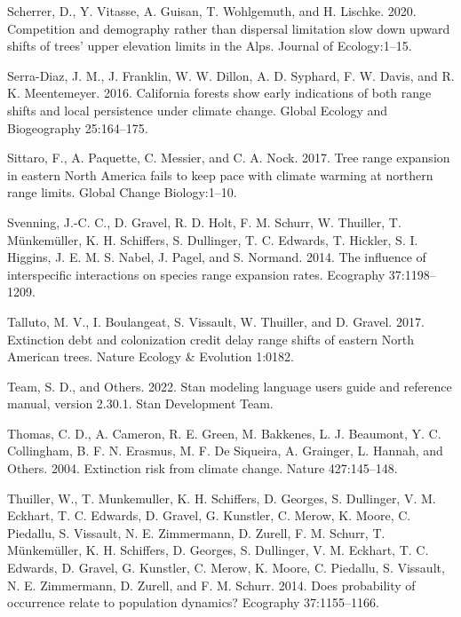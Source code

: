 \documentclass[12pt]{article}
\newlength{\cslhangindent}
\newenvironment{cslreferences}%
  {\setlength{\parindent}{0pt}%
  \everypar{\setlength{\hangindent}{\cslhangindent}}\ignorespaces}%
  {\par}
\begin{document}
\begin{cslreferences}
\leavevmode\hypertarget{ref-Scherrer2020}{}%
Scherrer, D., Y. Vitasse, A. Guisan, T. Wohlgemuth, and H. Lischke.
2020. Competition and demography rather than dispersal limitation slow
down upward shifts of trees' upper elevation limits in the Alps. Journal
of Ecology:1--15.

\leavevmode\hypertarget{ref-SerraDiaz2016}{}%
Serra-Diaz, J. M., J. Franklin, W. W. Dillon, A. D. Syphard, F. W.
Davis, and R. K. Meentemeyer. 2016. California forests show early
indications of both range shifts and local persistence under climate
change. Global Ecology and Biogeography 25:164--175.

\leavevmode\hypertarget{ref-Sittaro2017}{}%
Sittaro, F., A. Paquette, C. Messier, and C. A. Nock. 2017. Tree range
expansion in eastern North America fails to keep pace with climate
warming at northern range limits. Global Change Biology:1--10.

\leavevmode\hypertarget{ref-Svenning2014}{}%
Svenning, J.-C. C., D. Gravel, R. D. Holt, F. M. Schurr, W. Thuiller, T.
Münkemüller, K. H. Schiffers, S. Dullinger, T. C. Edwards, T. Hickler,
S. I. Higgins, J. E. M. S. Nabel, J. Pagel, and S. Normand. 2014. The
influence of interspecific interactions on species range expansion
rates. Ecography 37:1198--1209.

\leavevmode\hypertarget{ref-Talluto2017}{}%
Talluto, M. V., I. Boulangeat, S. Vissault, W. Thuiller, and D. Gravel.
2017. Extinction debt and colonization credit delay range shifts of
eastern North American trees. Nature Ecology \& Evolution 1:0182.

\leavevmode\hypertarget{ref-stan2022stan}{}%
Team, S. D., and Others. 2022. Stan modeling language users guide and
reference manual, version 2.30.1. Stan Development Team.

\leavevmode\hypertarget{ref-thomas2004}{}%
Thomas, C. D., A. Cameron, R. E. Green, M. Bakkenes, L. J. Beaumont, Y.
C. Collingham, B. F. N. Erasmus, M. F. De Siqueira, A. Grainger, L.
Hannah, and Others. 2004. Extinction risk from climate change. Nature
427:145--148.

\leavevmode\hypertarget{ref-Thuiller2014}{}%
Thuiller, W., T. Munkemuller, K. H. Schiffers, D. Georges, S. Dullinger,
V. M. Eckhart, T. C. Edwards, D. Gravel, G. Kunstler, C. Merow, K.
Moore, C. Piedallu, S. Vissault, N. E. Zimmermann, D. Zurell, F. M.
Schurr, T. Münkemüller, K. H. Schiffers, D. Georges, S. Dullinger, V. M.
Eckhart, T. C. Edwards, D. Gravel, G. Kunstler, C. Merow, K. Moore, C.
Piedallu, S. Vissault, N. E. Zimmermann, D. Zurell, and F. M. Schurr.
2014. Does probability of occurrence relate to population dynamics?
Ecography 37:1155--1166.


\end{cslreferences}
\end{document}
